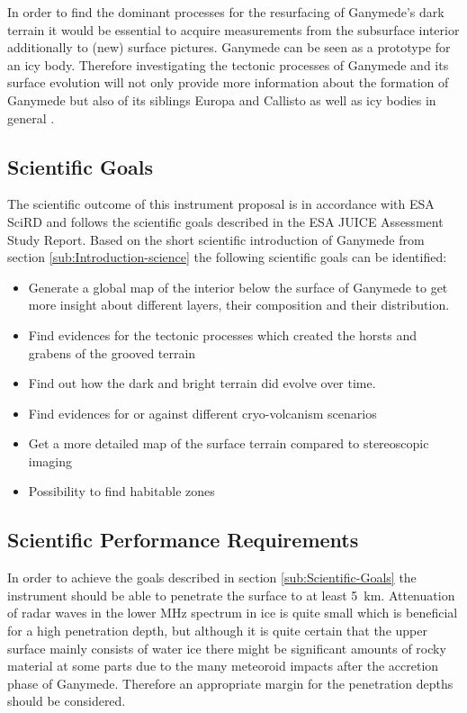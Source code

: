 In order to find the dominant processes for the resurfacing of Ganymede's
dark terrain it would be essential to acquire measurements from the
subsurface interior additionally to (new) surface pictures. Ganymede
can be seen as a prototype for an icy body. Therefore investigating
the tectonic processes of Ganymede and its surface evolution will
not only provide more information about the formation of Ganymede
but also of its siblings Europa and Callisto as well as icy bodies
in general \cite{bagenal2007jupiter}.


\subsection{Scientific Goals\label{sub:Scientific-Goals}}

The scientific outcome of this instrument proposal is in accordance
with ESA \ac{SciRD}\cite{SciRD} and follows the scientific goals
described in the ESA JUICE Assessment Study Report\cite{yellowbook}.
Based on the short scientific introduction of Ganymede from section
\ref{sub:Introduction-science} the following scientific goals can
be identified:
\begin{itemize}
\item Generate a global map of the interior below the surface of Ganymede
to get more insight about different layers, their composition and
their distribution.
\item Find evidences for the tectonic processes which created the horsts
and grabens of the grooved terrain
\item Find out how the dark and bright terrain did evolve over time.
\item Find evidences for or against different cryo-volcanism scenarios
\item Get a more detailed map of the surface terrain compared to stereoscopic
imaging
\item Possibility to find habitable zones 
\end{itemize}

\subsection{Scientific Performance Requirements}

In order to achieve the goals described in section \ref{sub:Scientific-Goals}
the instrument should be able to penetrate the surface to at least
5~km. Attenuation of radar waves in the lower MHz spectrum in ice
is quite small which is beneficial for a high penetration depth, but
although it is quite certain that the upper surface mainly consists
of water ice there might be significant amounts of rocky material
at some parts due to the many meteoroid impacts after the accretion
phase of Ganymede. Therefore an appropriate margin for the penetration
depths should be considered. 

